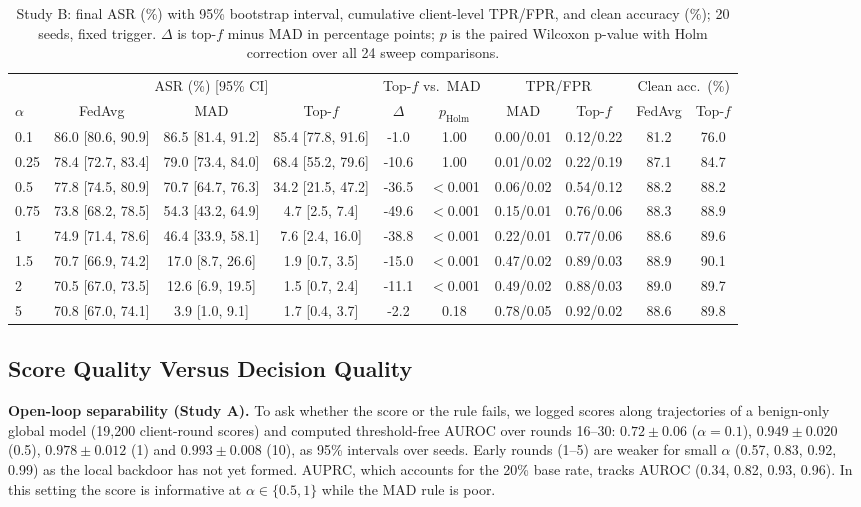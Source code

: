 \begin{table}[t]
\caption{Study B: final ASR (\%) with 95\% bootstrap interval, cumulative client-level TPR/FPR, and clean accuracy (\%); 20 seeds, fixed trigger. $\Delta$ is top-$f$ minus MAD in percentage points; $p$ is the paired Wilcoxon p-value with Holm correction over all 24 sweep comparisons.}
\label{tab:b}
\centering\footnotesize\setlength{\tabcolsep}{3.2pt}
\begin{tabular}{@{}lccccccccc@{}}
\toprule
 & \multicolumn{3}{c}{ASR (\%) [95\% CI]} & \multicolumn{2}{c}{Top-$f$ vs.\ MAD} & \multicolumn{2}{c}{TPR/FPR} & \multicolumn{2}{c}{Clean acc.\ (\%)}\\
\cmidrule(lr){2-4}\cmidrule(lr){5-6}\cmidrule(lr){7-8}\cmidrule(lr){9-10}
$\alpha$ & FedAvg & MAD & Top-$f$ & $\Delta$ & $p_\text{Holm}$ & MAD & Top-$f$ & FedAvg & Top-$f$\\
\midrule
0.1 & 86.0 [80.6, 90.9] & 86.5 [81.4, 91.2] & 85.4 [77.8, 91.6] & -1.0 & 1.00 & 0.00/0.01 & 0.12/0.22 & 81.2 & 76.0\\
0.25 & 78.4 [72.7, 83.4] & 79.0 [73.4, 84.0] & 68.4 [55.2, 79.6] & -10.6 & 1.00 & 0.01/0.02 & 0.22/0.19 & 87.1 & 84.7\\
0.5 & 77.8 [74.5, 80.9] & 70.7 [64.7, 76.3] & 34.2 [21.5, 47.2] & -36.5 & $<$0.001 & 0.06/0.02 & 0.54/0.12 & 88.2 & 88.2\\
0.75 & 73.8 [68.2, 78.5] & 54.3 [43.2, 64.9] & 4.7 [2.5, 7.4] & -49.6 & $<$0.001 & 0.15/0.01 & 0.76/0.06 & 88.3 & 88.9\\
1 & 74.9 [71.4, 78.6] & 46.4 [33.9, 58.1] & 7.6 [2.4, 16.0] & -38.8 & $<$0.001 & 0.22/0.01 & 0.77/0.06 & 88.6 & 89.6\\
1.5 & 70.7 [66.9, 74.2] & 17.0 [8.7, 26.6] & 1.9 [0.7, 3.5] & -15.0 & $<$0.001 & 0.47/0.02 & 0.89/0.03 & 88.9 & 90.1\\
2 & 70.5 [67.0, 73.5] & 12.6 [6.9, 19.5] & 1.5 [0.7, 2.4] & -11.1 & $<$0.001 & 0.49/0.02 & 0.88/0.03 & 89.0 & 89.7\\
5 & 70.8 [67.0, 74.1] & 3.9 [1.0, 9.1] & 1.7 [0.4, 3.7] & -2.2 & 0.18 & 0.78/0.05 & 0.92/0.02 & 88.6 & 89.8\\
\bottomrule
\end{tabular}
\end{table}

\subsection{Score Quality Versus Decision Quality}
\textbf{Open-loop separability (Study A).} To ask whether the score or the rule fails, we logged scores along trajectories of a benign-only global model (19,200 client-round scores) and computed threshold-free AUROC over rounds 16--30: $0.72\pm0.06$ ($\alpha=0.1$), $0.949\pm0.020$ (0.5), $0.978\pm0.012$ (1) and $0.993\pm0.008$ (10), as 95\% intervals over seeds. Early rounds (1--5) are weaker for small $\alpha$ (0.57, 0.83, 0.92, 0.99) as the local backdoor has not yet formed. AUPRC, which accounts for the 20\% base rate, tracks AUROC (0.34, 0.82, 0.93, 0.96). In this setting the score is informative at $\alpha\in\{0.5,1\}$ while the MAD rule is poor.

